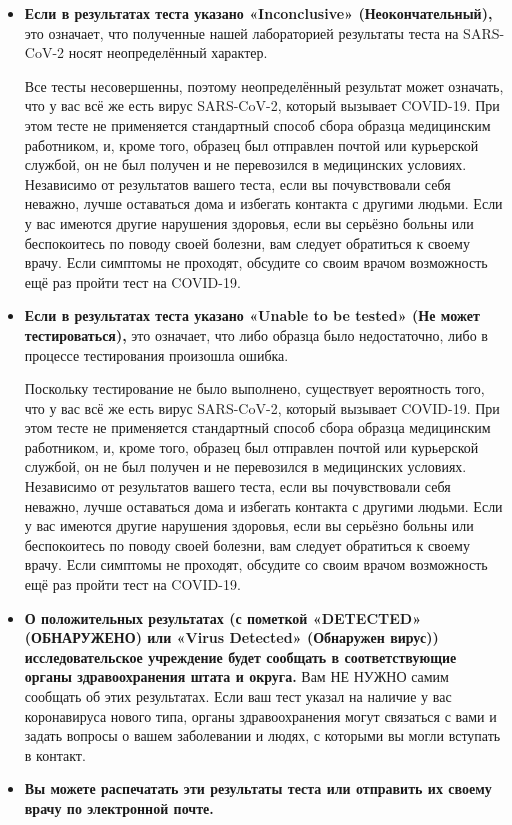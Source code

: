 \documentclass[10pt]{article}
\begin{document}
\begin{itemize}
\item

  \textbf{Если в результатах теста указано «Inconclusive» (Неокончательный),}
  это означает, что полученные нашей лабораторией результаты теста на SARS-CoV-2
  носят неопределённый характер.

  Все тесты несовершенны, поэтому неопределённый результат может означать, что у
  вас всё же есть вирус SARS-CoV-2, который вызывает COVID-19.  При этом тесте
  не применяется стандартный способ сбора образца медицинским работником, и,
  кроме того, образец был отправлен почтой или курьерской службой, он не был
  получен и не перевозился в медицинских условиях.  Независимо от результатов
  вашего теста, если вы почувствовали себя неважно, лучше оставаться дома и
  избегать контакта с другими людьми. Если у вас имеются другие нарушения
  здоровья, если вы серьёзно больны или беспокоитесь по поводу своей болезни,
  вам следует обратиться к своему врачу.  Если симптомы не проходят, обсудите со
  своим врачом возможность ещё раз пройти тест на COVID-19.

\item

  \textbf{Если в результатах теста указано «Unable to be tested» (Не может
  тестироваться),} это означает, что либо образца было недостаточно, либо в
  процессе тестирования произошла ошибка.

  Поскольку тестирование не было выполнено, существует вероятность того, что у
  вас всё же есть вирус SARS-CoV-2, который вызывает COVID-19.  При этом тесте
  не применяется стандартный способ сбора образца медицинским работником, и,
  кроме того, образец был отправлен почтой или курьерской службой, он не был
  получен и не перевозился в медицинских условиях.  Независимо от результатов
  вашего теста, если вы почувствовали себя неважно, лучше оставаться дома и
  избегать контакта с другими людьми. Если у вас имеются другие нарушения
  здоровья, если вы серьёзно больны или беспокоитесь по поводу своей болезни,
  вам следует обратиться к своему врачу.  Если симптомы не проходят, обсудите со
  своим врачом возможность ещё раз пройти тест на COVID-19.

\item

  \textbf{О положительных результатах (с пометкой «DETECTED» (ОБНАРУЖЕНО) или
  «Virus Detected» (Обнаружен вирус)) исследовательское учреждение будет
  сообщать в соответствующие органы здравоохранения штата и округа.} Вам НЕ
  НУЖНО самим сообщать об этих результатах.  Если ваш тест указал на наличие у
  вас коронавируса нового типа, органы здравоохранения могут связаться с вами и
  задать вопросы о вашем заболевании и людях, с которыми вы могли вступать в
  контакт.

\item

  \textbf{Вы можете распечатать эти результаты теста или отправить их своему
  врачу по электронной почте.}

\end{itemize}
\end{document}
